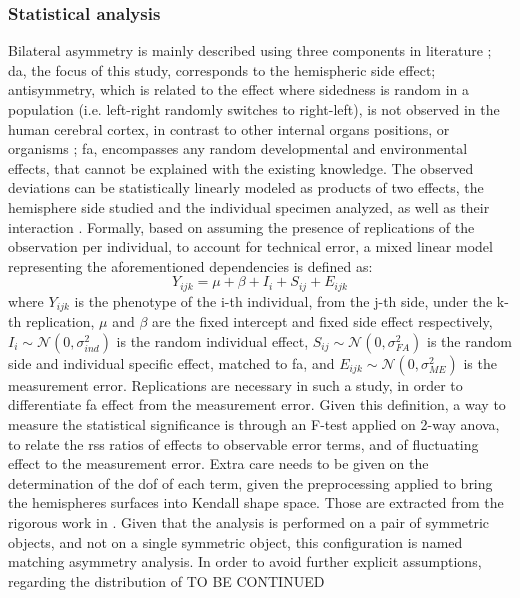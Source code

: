 \subsubsection{Statistical analysis}
Bilateral asymmetry is mainly described using three components in literature \cite{klingenberg2002}\cite{Vingerhoets2021}; \acf{da}, the focus of this study, corresponds to the hemispheric side effect; antisymmetry, which is related to the effect where sidedness is random in a population (i.e. left-right randomly switches to right-left), is not observed in the human cerebral cortex, in contrast to other internal organs positions, or organisms \cite{Neubauer2020}; \acf{fa}, encompasses any random developmental and environmental effects, that cannot be explained with the existing knowledge. The observed deviations can be statistically linearly modeled as products of two effects, the hemisphere side studied and the individual specimen analyzed, as well as their interaction \cite{klingenberg2002}. Formally, based on \cite{VanDongen1999} assuming the presence of replications of the observation per individual, to account for technical error, a mixed linear model representing the aforementioned dependencies is defined as:
\begin{equation}
	Y_{ijk} = \mu + \beta + I_i + S_{ij} + E_{ijk}
\end{equation}
where $Y_{ijk}$ is the phenotype of the i-th individual, from the j-th side, under the k-th replication, $\mu$ and $\beta$ are the fixed intercept and fixed side effect respectively, $I_i\sim\mathcal{N}(0,\sigma^2_{ind})$ is the random individual effect,  $S_{ij}\sim\mathcal{N}(0,\sigma^2_{FA})$ is the random side and individual specific effect, matched to \ac{fa}, and $E_{ijk}\sim\mathcal{N}(0,\sigma^2_{ME})$ is the measurement error. Replications are necessary in such a study, in order to differentiate \ac{fa} effect from the measurement error. Given this definition, a way to measure the statistical significance is through an F-test applied on 2-way \ac{anova}, to relate the \ac{rss} ratios of effects to observable error terms, and of fluctuating effect to the measurement error. Extra care needs to be given on the determination of the \ac{dof} of each term, given the preprocessing applied to bring the hemispheres surfaces into Kendall shape space. Those are extracted from the rigorous work in \cite{klingenberg2002}. Given that the analysis is performed on a pair of symmetric objects, and not on a single symmetric object, this configuration is named matching asymmetry analysis. In order to avoid further explicit assumptions, regarding the distribution of TO BE CONTINUED

